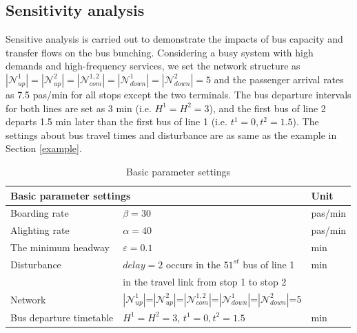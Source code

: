 \documentclass[smallextended]{svjour3}       %
\begin{document}
\begin{Abstract}
\subsection{Sensitivity analysis}\label{sensitivity}
Sensitive analysis is carried out to demonstrate the impacts of bus capacity and transfer flows on the bus bunching.
Considering a busy system with high demands and high-frequency services, 
we set the network structure as 
$\left| \mathcal{N}_{up}^{1}\right|=
\left| \mathcal{N}_{up}^{2} \right|=
\left| \mathcal{N}_{com}^{1,2} \right|=
\left| \mathcal{N}_{down}^{1} \right|=
\left| \mathcal{N}_{down}^{2} \right| = 5$
and the passenger arrival rates as 7.5 pas/min for all stops except the two terminals. 
The bus departure intervals for both lines are set as 3 min (i.e. $H^{1}=H^{2}=3$), 
and the first bus of line 2 departs 1.5 min later than the first bus of line 1 (i.e. $t^{1}=0,t^{2}=1.5$). 
The settings about bus travel times and disturbance are as same as the example in Section \ref{example}. 
\begin{table}[H]
  \caption{Basic parameter settings}
  \centering
  \begin{tabular}{p{3.4cm}p{6.5cm}p{1.1cm}}
      \hline
      \multicolumn{2}{l}{\textbf{Basic parameter settings}} & \textbf{Unit}      \\ \hline
      Boarding rate & $\beta=30$                            & pas/min            \\ 
      Alighting rate & $\alpha=40$                          & pas/min            \\ 
      The minimum headway & $\varepsilon=0.1$               & min                \\      
      Disturbance & $delay=2$  occurs in the $51^{st}$ bus of line 1&min         \\ 
                  & in the travel link from stop 1 to stop 2                     \\ 
      Network     & $|\mathcal{N}_{up}^{1}|$=$|\mathcal{N}_{up}^{2}|$=$|\mathcal{N}_{com}^{1,2}|$=$|\mathcal{N}_{down}^{1}|$=$|\mathcal{N}_{down}^{2}|$=5& \\
      Bus departure timetable & $H^{1}=H^{2}=3$, $t^{1}=0,t^{2}=1.5$ & min       \\

\end{tabular}
\end{table}
\end{Abstract}
\end{document}
